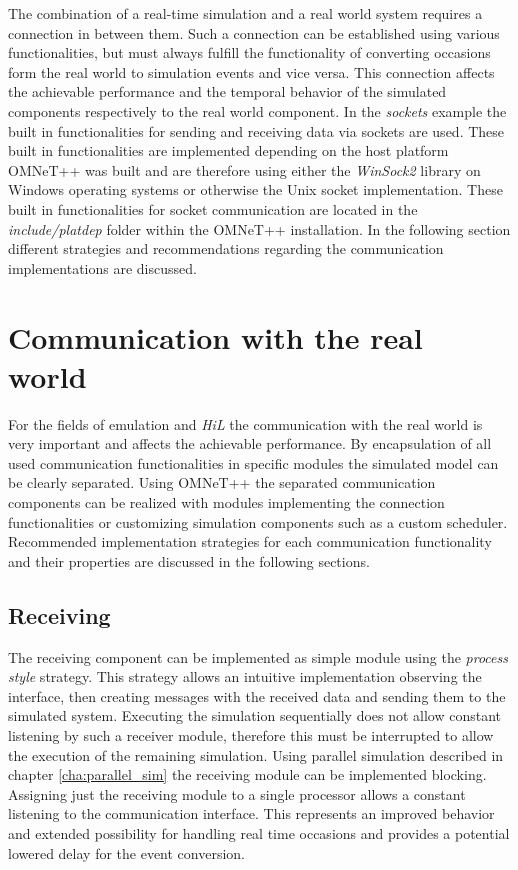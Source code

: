 The combination of a real-time simulation and a real world system requires a connection in between them.
Such a connection can be established using various functionalities, but must always fulfill the functionality of converting occasions form the real world to simulation events and vice versa.
This connection affects the achievable performance and the temporal behavior of the simulated components respectively to the real world component.
In the \emph{sockets} example the built in functionalities for sending and receiving data via sockets are used.
These built in functionalities are implemented depending on the host platform OMNeT++ was built and are therefore using either the \emph{WinSock2} library on Windows operating systems or otherwise the Unix socket implementation.
These built in functionalities for socket communication are located in the \emph{include/platdep} folder within the OMNeT++ installation.
In the following section different strategies and recommendations regarding the communication implementations are discussed.

\section{Communication with the real world}
\label{sec:emulation_communication}
For the fields of emulation and \emph{HiL} the communication with the real world is very important and affects the achievable performance.
By encapsulation of all used communication functionalities in specific modules the simulated model can be clearly separated.
Using OMNeT++ the separated communication components can be realized with modules implementing the connection functionalities or customizing simulation components such as a custom scheduler.
Recommended implementation strategies for each communication functionality and their properties are discussed in the following sections.

\subsection{Receiving}
\label{sec:emulation_communication_receiving}

The receiving component can be implemented as simple module using the \emph{process style} strategy.
This strategy allows an intuitive implementation observing the interface, then creating messages with the received data and sending them to the simulated system.
Executing the simulation sequentially does not allow constant listening by such a receiver module, therefore this must be interrupted to allow the execution of the remaining simulation.
Using parallel simulation described in chapter \ref{cha:parallel_sim} the receiving module can be implemented blocking.
Assigning just the receiving module to a single processor allows a constant listening to the communication interface.
This represents an improved behavior and extended possibility for handling real time occasions and provides a potential lowered delay for the event conversion.

